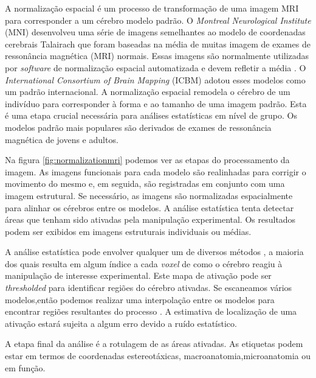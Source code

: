 \documentclass[openright]{UFRGS} %
\begin{document}
A normalização espacial é um processo de transformação de uma imagem MRI
para corresponder a um cérebro modelo padrão.
O \textit{Montreal Neurological Institute} (MNI) desenvolveu uma série de imagens semelhantes ao  modelo de coordenadas cerebrais Talairach que foram baseadas na média de muitas imagem de exames de ressonância magnética (MRI) normais. Essas imagens são normalmente utilizadas por \textit{software} de normalização espacial automatizada e devem refletir a média \cite{moraisinfluencia}. O \textit{International Consortium of Brain Mapping} (ICBM) adotou esses modelos como um padrão internacional. A normalização espacial remodela o cérebro de um indivíduo para corresponder à forma e ao tamanho de uma imagem padrão. Esta é uma etapa crucial necessária para análises estatísticas em nível de grupo. Os modelos padrão mais populares são derivados de exames de ressonância magnética de jovens e adultos. 

Na figura \ref{fig:normalizationmri} podemos ver as etapas do processamento da imagem. As imagens funcionais para cada modelo são realinhadas para corrigir o movimento do mesmo e, em seguida, são registradas em conjunto com uma imagem estrutural. Se necessário, as imagens são normalizadas espacialmente para alinhar os cérebros entre os modelos. A análise estatística tenta detectar áreas que tenham sido ativadas pela manipulação experimental. Os resultados podem ser exibidos em imagens estruturais individuais ou médias.

A análise estatística pode envolver qualquer um de diversos métodos , a maioria dos quais resulta em algum índice a cada \textit{voxel} de como o cérebro reagiu à manipulação de interesse experimental. Este mapa de ativação pode ser \textit{thresholded} para identificar regiões do cérebro ativadas. Se escaneamos vários modelos,então podemos realizar uma interpolação entre os modelos para
encontrar regiões resultantes do processo  \cite{brett2002problem}. A estimativa de localização de uma ativação estará sujeita a algum erro devido a ruído estatístico.

A etapa final da análise é a rotulagem de as áreas ativadas. As etiquetas podem estar em termos de coordenadas estereotáxicas, macroanatomia,microanatomia ou  em função.
\end{document}
